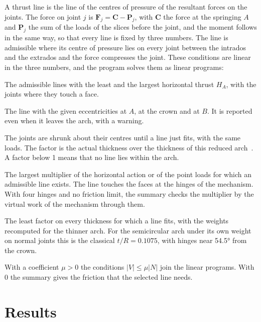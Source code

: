 \documentclass[fontsize=10.5pt,paper=a4,parskip=half,headings=normal,numbers=noenddot,
  open=any,bibliography=totoc,captions=tableheading]{scrreprt}
\numberwithin{figure}{chapter}
\numberwithin{table}{chapter}
\newcommand{\F}{\mathbf F}
\newcommand{\C}{\mathbf C}
\newcommand{\Pv}{\mathbf P}
\begin{document}
A thrust line is the line of the centres of pressure of the resultant forces on the joints. The force on
joint $j$ is $\F_j=\C-\Pv_j$, with $\C$ the force at the springing $A$ and $\Pv_j$ the sum of the loads
of the slices before the joint, and the moment follows in the same way, so that every line is fixed by
three numbers. The line is admissible where its centre of pressure lies on every joint between the
intrados and the extrados and the force compresses the joint. These conditions are linear in the three
numbers, and the program solves them as linear programs:
\begin{description}[leftmargin=0pt,labelsep=0.5em]
\item[Minimum and maximum thrust.] The admissible lines with the least and the largest horizontal thrust
$H_A$, with the joints where they touch a face.
\item[Line through three points.] The line with the given eccentricities at $A$, at the crown and at
$B$. It is reported even when it leaves the arch, with a warning.
\item[Geometric safety factor.] The joints are shrunk about their centres until a line just fits, with
the same loads. The factor is the actual thickness over the thickness of this reduced
arch~\cite{heyman1969}. A factor below 1 means that no line lies within the arch.
\item[Collapse multiplier.] The largest multiplier of the horizontal action or of the point loads for
which an admissible line exists. The line touches the faces at the hinges of the mechanism. With four
hinges and no friction limit, the summary checks the multiplier by the virtual work of the mechanism
through them.
\item[Minimum thickness.] The least factor on every thickness for which a line fits, with the weights
recomputed for the thinner arch. For the semicircular arch under its own weight on normal joints this is
the classical $t/R=0.1075$, with hinges near 54.5° from the crown.
\item[Friction.] With a coefficient $\mu>0$ the conditions $|V|\le\mu|N|$ join the linear programs. With
0 the summary gives the friction that the selected line needs.
\end{description}

\section{Results}
\end{document}
